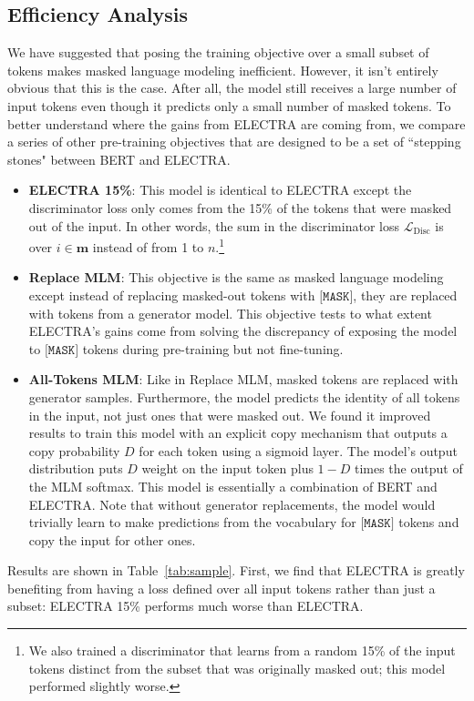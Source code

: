 \documentclass{article}
\newcommand{\I}{\bm{m}}
\newcommand{\lossds}{\mathcal{L}_\text{Disc}}
\begin{document}
\subsection{Efficiency Analysis}
We have suggested that posing the training objective over a small subset of tokens makes masked language modeling inefficient.
However, it isn't entirely obvious that this is the case.
After all, the model still receives a large number of input tokens even though it predicts only a small number of masked tokens.
To better understand where the gains from ELECTRA are coming from, we compare a series of other pre-training objectives that are designed to be a set of ``stepping stones" between BERT and ELECTRA.
\begin{itemize}
    \item \textbf{ELECTRA 15\%}: This model is identical to ELECTRA except the discriminator loss only comes from the 15\% of the tokens that were masked out of the input. In other words, the sum in the discriminator loss $\lossds$ is over $i \in \I$ instead of from 1 to $n$.\footnote{We also trained a discriminator that learns from a random 15\% of the input tokens distinct from the subset that was originally masked out; this model performed slightly worse.}
    \item \textbf{Replace MLM}: This objective is the same as masked language modeling except instead of replacing masked-out tokens with $\texttt{[MASK]}$, they are replaced with tokens from a generator model. This objective tests to what extent ELECTRA's gains come from solving the discrepancy of exposing the model to $\texttt{[MASK]}$ tokens during pre-training but not fine-tuning.
    \item \textbf{All-Tokens MLM}: Like in Replace MLM, masked tokens are replaced with generator samples. Furthermore, the model predicts the identity of all tokens in the input, not just ones that were masked out. 
    We found it improved results to train this model with an explicit copy mechanism that outputs a copy probability $D$ for each token using a sigmoid layer. The model's output distribution puts $D$ weight on the input token plus $1 - D$ times the output of the MLM softmax. This model is essentially a combination of BERT and ELECTRA.
    Note that without generator replacements, the model would trivially learn to make predictions from the vocabulary for $\texttt{[MASK]}$ tokens and copy the input for other ones. 
\end{itemize}
Results are shown in Table~\ref{tab:sample}. 
First, we find that ELECTRA is greatly benefiting from having a loss defined over all input tokens rather than just a subset: ELECTRA 15\% performs much worse than ELECTRA. 
\end{document}
